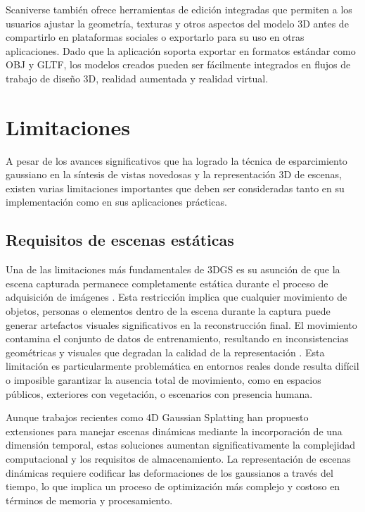 \documentclass[lettersize,journal]{IEEEtran}
\begin{document}
Scaniverse también ofrece herramientas de edición integradas que permiten a los usuarios ajustar la geometría, texturas y otros aspectos del modelo 3D antes de compartirlo en plataformas sociales o exportarlo para su uso en otras aplicaciones. Dado que la aplicación soporta exportar en formatos estándar como OBJ y GLTF, los modelos creados pueden ser fácilmente integrados en flujos de trabajo de diseño 3D, realidad aumentada y realidad virtual.


\section{Limitaciones}

A pesar de los avances significativos que ha logrado la técnica de esparcimiento gaussiano en la síntesis de vistas novedosas y la representación 3D de escenas, existen varias limitaciones importantes que deben ser consideradas tanto en su implementación como en sus aplicaciones prácticas.

\subsection{Requisitos de escenas estáticas}

Una de las limitaciones más fundamentales de 3DGS es su asunción de que la escena capturada permanece completamente estática durante el proceso de adquisición de imágenes \cite{Kerbl2023}. Esta restricción implica que cualquier movimiento de objetos, personas o elementos dentro de la escena durante la captura puede generar artefactos visuales significativos en la reconstrucción final. El movimiento contamina el conjunto de datos de entrenamiento, resultando en inconsistencias geométricas y visuales que degradan la calidad de la representación \cite{Matias2025}. Esta limitación es particularmente problemática en entornos reales donde resulta difícil o imposible garantizar la ausencia total de movimiento, como en espacios públicos, exteriores con vegetación, o escenarios con presencia humana.

Aunque trabajos recientes como 4D Gaussian Splatting \cite{Wu2024} han propuesto extensiones para manejar escenas dinámicas mediante la incorporación de una dimensión temporal, estas soluciones aumentan significativamente la complejidad computacional y los requisitos de almacenamiento. La representación de escenas dinámicas requiere codificar las deformaciones de los gaussianos a través del tiempo, lo que implica un proceso de optimización más complejo y costoso en términos de memoria y procesamiento.
\end{document}

